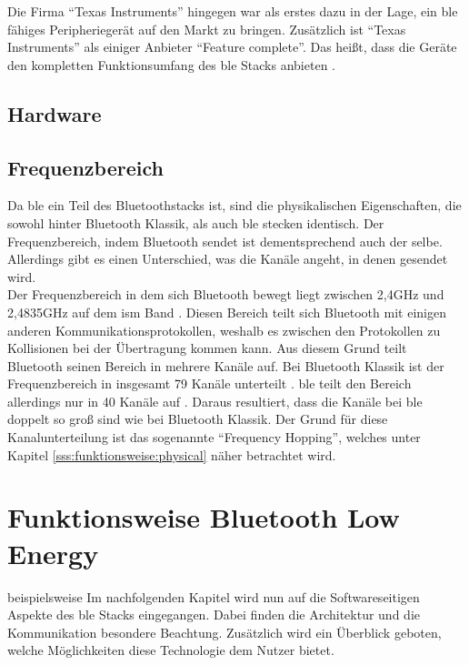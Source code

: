 \noindent Die Firma "`Texas Instruments"' hingegen war als erstes dazu in der Lage, ein \ac{ble} fähiges Peripheriegerät auf den Markt zu bringen. Zusätzlich ist "`Texas Instruments"' als einiger Anbieter "`Feature complete"'. Das heißt, dass die Geräte den kompletten Funktionsumfang des \ac{ble} Stacks anbieten \cite[Seite 79]{Townsend14:GSB}.\\ 

\subsection{Hardware}
\label{ss:grundlagen:hardware}

  

\subsection{Frequenzbereich}
\label{ss:grundlagen:frequenz}

Da \ac{ble} ein Teil des Bluetoothstacks ist, sind die physikalischen Eigenschaften, die sowohl hinter Bluetooth Klassik, als auch \ac{ble} stecken identisch. Der Frequenzbereich, indem Bluetooth sendet ist dementsprechend auch der selbe. Allerdings gibt es einen Unterschied, was die Kanäle angeht, in denen gesendet wird.\\

\noindent Der Frequenzbereich in dem sich Bluetooth bewegt liegt zwischen 2,4GHz und 2,4835GHz auf dem \ac{ism} Band \cite[Seite 16]{Townsend14:GSB}. Diesen Bereich teilt sich Bluetooth mit einigen anderen Kommunikationsprotokollen, weshalb es zwischen den Protokollen zu Kollisionen bei der Übertragung kommen kann. Aus diesem Grund teilt Bluetooth seinen Bereich in mehrere Kanäle auf. Bei Bluetooth Klassik ist der Frequenzbereich in insgesamt 79 Kanäle unterteilt \cite[Seite 410]{Sauter18:GMK}. \ac{ble} teilt den Bereich allerdings nur in 40 Kanäle auf \cite[Seite 16]{Townsend14:GSB}. Daraus resultiert, dass die Kanäle bei \ac{ble} doppelt so groß sind wie bei Bluetooth Klassik. Der Grund für diese Kanalunterteilung ist das sogenannte "`Frequency Hopping"', welches unter Kapitel \ref{sss:funktionsweise:physical} näher betrachtet wird.\\  

\section{Funktionsweise Bluetooth Low Energy}
\label{s:funktionsweise}
beispielsweise
Im nachfolgenden Kapitel wird nun auf die Softwareseitigen Aspekte des \ac{ble} Stacks eingegangen. Dabei finden die Architektur und die Kommunikation besondere Beachtung. Zusätzlich wird ein Überblick geboten, welche Möglichkeiten diese Technologie dem Nutzer bietet.\\  

